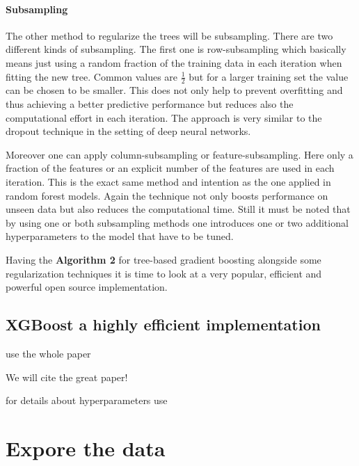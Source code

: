 \documentclass[
]{book}
\begin{document}
\hypertarget{subsampling}{%
\subsubsection{Subsampling}\label{subsampling}}

The other method to regularize the trees will be subsampling. There are two different kinds of subsampling. The first one is row-subsampling which basically means just using a random fraction of the training data in each iteration when fitting the new tree. Common values are \(\frac{1}{2}\) but for a larger training set the value can be chosen to be smaller. This does not only help to prevent overfitting and thus achieving a better predictive performance but reduces also the computational effort in each iteration.\citep{elements} The approach is very similar to the dropout technique in the setting of deep neural networks.

Moreover one can apply column-subsampling or feature-subsampling. Here only a fraction of the features or an explicit number of the features are used in each iteration. This is the exact same method and intention as the one applied in random forest models. Again the technique not only boosts performance on unseen data but also reduces the computational time.\citep{xgboost_paper} Still it must be noted that by using one or both subsampling methods one introduces one or two additional hyperparameters to the model that have to be tuned.

Having the \textbf{Algorithm 2} for tree-based gradient boosting alongside some regularization techniques it is time to look at a very popular, efficient and powerful open source implementation.

\hypertarget{xgboost-a-highly-efficient-implementation}{%
\section{XGBoost a highly efficient implementation}\label{xgboost-a-highly-efficient-implementation}}

use the whole paper

We will cite the great paper!\citep{xgboost_paper}

for details about hyperparameters use \citep{HandsOnMLwithR}

\hypertarget{eda}{%
\chapter{Expore the data}\label{eda}}
\end{document}
